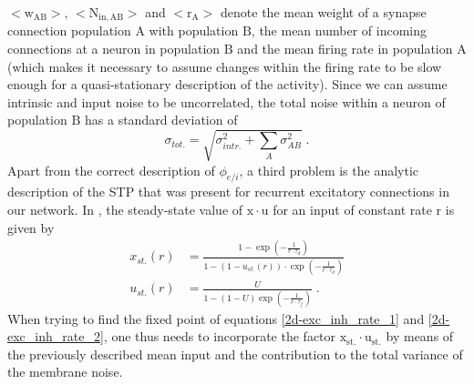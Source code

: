 \documentclass[10pt,a4paper]{article}
\begin{document}
$\mathrm{<w_{AB}>,\, <N_{in,AB}>}$ and $\mathrm{<r_A>}$ denote the mean weight of a synapse connection population $\mathrm{A}$ with population $\mathrm{B}$, the mean number of incoming connections at a neuron in population $\mathrm{B}$ and the mean firing rate in population $\mathrm{A}$ (which makes it necessary to assume changes within the firing rate to be slow enough for a quasi-stationary description of the activity).
Since we can assume intrinsic and input noise to be uncorrelated, the total noise within a neuron of population $\mathrm{B}$ has a standard deviation of 
\begin{equation}
\sigma_{tot.} = \sqrt{\sigma_{intr.}^2 + \sum_A \sigma_{AB}^2} \; .
\label{Total_Noise_Neuron}
\end{equation}
Apart from the correct description of $\phi_{e/i}$, a third problem is the analytic description of the STP that was present for recurrent excitatory connections in our network. In \cite{Markram_STP}, the steady-state value of $\mathrm{x\cdot u}$ for an input of constant rate $\mathrm{r}$ is given by
\begin{align}
x_{st.}(r) &= \frac{1-\exp \left(-\frac{1}{r\cdot \tau _d}\right)}{1-\left(1-u_{st.}\left(r\right)\right)\cdot \exp \left(-\frac{1}{r\cdot \tau _d}\right)} \label{STP_steady1} \\
u_{st.}(r) &= \frac{U}{1-\left(1-U\right)\exp \left(-\frac{1}{r\cdot \tau _f}\right)} \; .\label{STP_steady2}
\end{align}
When trying to find the fixed point of equations \ref{2d-exc_inh_rate_1} and \ref{2d-exc_inh_rate_2}, one thus needs to incorporate the factor $\mathrm{x_{st.}\cdot u_{st.}}$ by means of the previously described mean input and the contribution to the total variance of the membrane noise.
 
\end{document}
